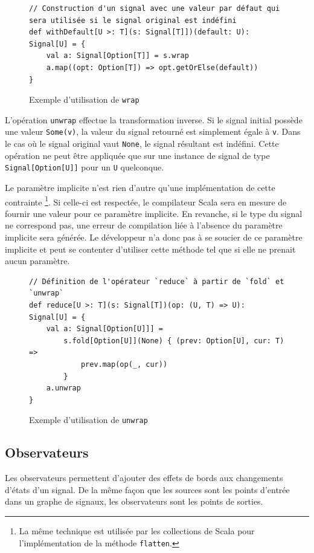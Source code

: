\begin{figure}[h]
	\begin{lstlisting}
// Construction d'un signal avec une valeur par défaut qui sera utilisée si le signal original est indéfini
def withDefault[U >: T](s: Signal[T]])(default: U): Signal[U] = {
	val a: Signal[Option[T]] = s.wrap
	a.map((opt: Option[T]) => opt.getOrElse(default))
}
	\end{lstlisting}
	\caption{Exemple d'utilisation de \texttt{wrap}}
\end{figure}

L'opération \texttt{unwrap} effectue la transformation inverse. Si le signal initial possède une valeur \texttt{Some(v)}, la valeur du signal retourné est simplement égale à \texttt{v}. Dans le cas où le signal original vaut \texttt{None}, le signal résultant est indéfini. Cette opération ne peut être appliquée que sur une instance de signal de type \texttt{Signal[Option[U]]} pour un \texttt{U} quelconque.

Le paramètre implicite n'est rien d'autre qu'une implémentation de cette contrainte \footnote{La même technique est utilisée par les collections de Scala pour l'implémentation de la méthode \texttt{flatten}.}. Si celle-ci est respectée, le compilateur Scala sera en mesure de fournir une valeur pour ce paramètre implicite. En revanche, si le type du signal ne correspond pas, une erreur de compilation liée à l'absence du paramètre implicite sera générée. Le développeur n'a donc pas à se soucier de ce paramètre implicite et peut se contenter d'utiliser cette méthode tel que si elle ne prenait aucun paramètre.

\begin{figure}[h]
	\begin{lstlisting}
// Définition de l'opérateur `reduce` à partir de `fold` et `unwrap`
def reduce[U >: T](s: Signal[T])(op: (U, T) => U): Signal[U] = {
	val a: Signal[Option[U]]] =
		s.fold[Option[U]](None) { (prev: Option[U], cur: T) =>
			prev.map(op(_, cur))
		}
	a.unwrap
}
	\end{lstlisting}
	\caption{Exemple d'utilisation de \texttt{unwrap}}
\end{figure}

\subsection{Observateurs} \label{sec:sig-obs}

Les observateurs permettent d'ajouter des effets de bords aux changements d'états d'un signal. De la même façon que les sources sont les points d'entrée dans un graphe de signaux, les observateurs sont les points de sorties.

